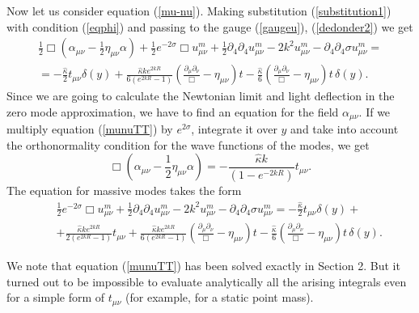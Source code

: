 \documentclass[a4paper,12pt]{article}
\begin{document}
Now let us consider equation (\ref{mu-nu}). Making substitution
(\ref{substitution1}) with condition (\ref{eqphi}) and passing to
the gauge (\ref{gaugeu}), (\ref{dedonder2}) we get
\begin{eqnarray}\label{munuTT}
\frac{1}{2}\Box(\alpha_{\mu\nu}-\frac{1}{2}\eta_{\mu\nu}\alpha)
 + \frac{1}{2}e^{-2\sigma}\Box
u^m_{\mu\nu}+\frac{1}{2}\partial_4
\partial_4 u^m_{\mu\nu}-2k^2u^m_{\mu\nu}-\partial_4
\partial_4\sigma u^m_{\mu\nu}= \\ \nonumber
=-\frac{\hat\kappa}{2}t_{\mu\nu}\delta(y)+\frac{\hat\kappa k
e^{2kR}}{6(e^{2kR}-1)}\left(\frac{\partial_\mu\partial_\nu}{\Box}-
\eta_{\mu\nu}\right)t -\frac{\hat \kappa}{6}
\left(\frac{\partial_\mu\partial_\nu}{\Box}-\eta_{\mu\nu}\right)
t\,\delta(y).
\end{eqnarray}
Since we are going to calculate the  Newtonian limit and light deflection
in the  zero mode approximation, we have to find an equation for the
field $\alpha_{\mu\nu}$. If we multiply equation (\ref{munuTT}) by
$e^{2\sigma}$, integrate it over $y$ and take into account the  orthonormality
condition for the wave functions of the modes, we get
\begin{equation}
\Box (\alpha_{\mu\nu}-\frac{1}{2}\eta_{\mu\nu}\alpha)
=-\frac{\hat\kappa k}{(1-e^{-2kR})}t_{\mu\nu}.
\end{equation}
The equation for massive modes takes the form
\begin{eqnarray}
&&\frac{1}{2}e^{-2\sigma}\Box u^m_{\mu\nu}+\frac{1}{2}\partial_4
\partial_4 u^m_{\mu\nu}-2k^2u^m_{\mu\nu}-\partial_4
\partial_4\sigma u^m_{\mu\nu}=-\frac{\hat\kappa}{2}t_{\mu\nu}\delta(y)+
 \\ \nonumber
&&+ \frac{\hat\kappa k e^{2kR} }{2(e^{2kR}-1)}t_{\mu\nu} +\frac{\hat\kappa k
e^{2kR}}{6(e^{2kR}-1)}\left(\frac{\partial_\mu\partial_\nu}{\Box}-
\eta_{\mu\nu}\right)t-\frac{\hat \kappa
}{6}\left(\frac{\partial_\mu\partial_\nu}{\Box}-
\eta_{\mu\nu}\right)t\,\delta(y).
\end{eqnarray}

We note that equation (\ref{munuTT}) has been solved exactly in Section 2.
But it turned out to be impossible to evaluate analytically all the arising
integrals even for a simple form of $t_{\mu\nu}$ (for example, for a static
point mass).
\end{document}
